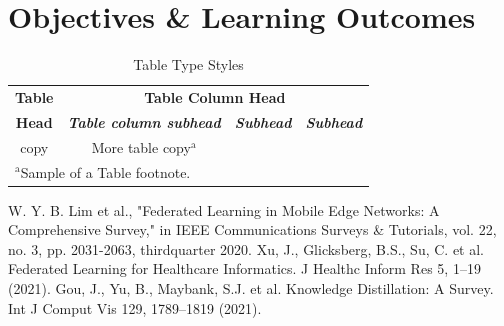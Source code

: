 \documentclass[conference]{IEEEtran}
\begin{document}
\section{Objectives \& Learning Outcomes}

\begin{table}[htbp]
\caption{Table Type Styles}
\begin{center}
\begin{tabular}{|c|c|c|c|}
\hline
\textbf{Table}&\multicolumn{3}{|c|}{\textbf{Table Column Head}} \\
\cline{2-4} 
\textbf{Head} & \textbf{\textit{Table column subhead}}& \textbf{\textit{Subhead}}& \textbf{\textit{Subhead}} \\
\hline
copy& More table copy$^{\mathrm{a}}$& &  \\
\hline
\multicolumn{4}{l}{$^{\mathrm{a}}$Sample of a Table footnote.}
\end{tabular}
\label{tab1}
\end{center}
\end{table}

\begin{thebibliography}{00}
 W. Y. B. Lim et al., "Federated Learning in Mobile Edge Networks: A Comprehensive Survey," in IEEE Communications Surveys \& Tutorials, vol. 22, no. 3, pp. 2031-2063, thirdquarter 2020.
 Xu, J., Glicksberg, B.S., Su, C. et al. Federated Learning for Healthcare Informatics. J Healthc Inform Res 5, 1–19 (2021).
 Gou, J., Yu, B., Maybank, S.J. et al. Knowledge Distillation: A Survey. Int J Comput Vis 129, 1789–1819 (2021).
\end{thebibliography}
\end{document}
